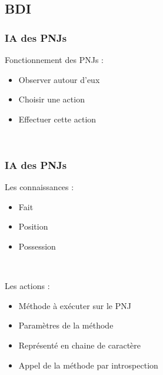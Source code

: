 \documentclass{beamer}
\begin{document}
\subsection{BDI}
\begin{frame}
  \frametitle{IA des PNJs}
  Fonctionnement des PNJs :
  \begin{itemize}
  \item Observer autour d'eux
  \item Choisir une action
  \item Effectuer cette action
  \end{itemize}
  ~\\  
\end{frame}

\begin{frame}
  \frametitle{IA des PNJs}
  Les connaissances :
  \begin{itemize}
  \item Fait
  \item Position
  \item Possession
  \end{itemize}
  ~\\
\end{frame}

\begin{frame}
  Les actions :
  \begin{itemize}
  \item Méthode à exécuter sur le PNJ
  \item Paramètres de la méthode
  \item Représenté en chaine de caractère
  \item Appel de la méthode par introspection
  \end{itemize}
\end{frame}
\end{document}
